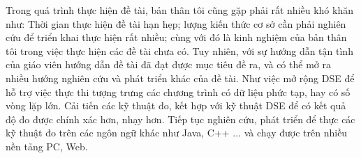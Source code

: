 Trong quá trình thực hiện đề tài, bản thân tôi cũng gặp phải rất nhiều khó khăn như: Thời gian thực hiện đề tài hạn hẹp; lượng kiến thức cơ sở cần phải nghiên cứu để triển khai thực hiện rất nhiều; cùng với đó là kinh nghiệm của bản thân tôi trong việc thực hiện các đề tài chưa có. Tuy nhiên, với sự hướng dẫn tận tình của giáo viên hướng dẫn đề tài đã đạt được mục tiêu đề ra, và có thể mở ra nhiều hướng nghiên cứu và phát triển khác của đề tài. Như việc mở rộng DSE để hỗ trợ việc thực thi tượng trưng các chương trình có dữ liệu phức tạp, hay có số vòng lặp lớn. Cải tiến các kỹ thuật đo, kết hợp với kỹ thuật DSE để có kết quả độ đo được chính xác hơn, nhạy hơn. Tiếp tục nghiên cứu, phát triển để thực các kỹ thuật đo trên các ngôn ngữ khác như Java, C++ ... và chạy được trên nhiều nền tảng PC, Web. 

